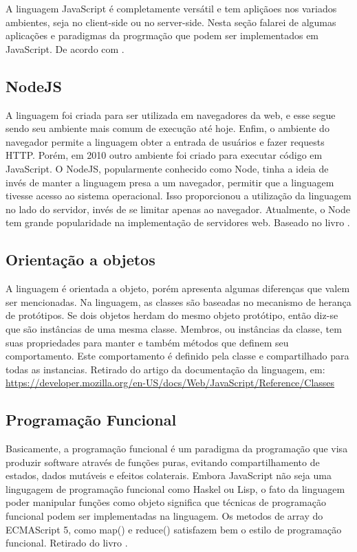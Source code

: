    A linguagem JavaScript é completamente versátil e tem apliçãoes nos variados ambientes, seja no client-side ou no server-side. 
   Nesta seção
   falarei de algumas aplicações e paradigmas da progrmação que podem ser implementados em JavaScript.
   De acordo com \cite{flanagan2020javascript}.
        \subsection{NodeJS}
        A linguagem foi criada para ser utilizada em navegadores da web, e esse segue sendo seu ambiente mais comum de execução até hoje. Enfim, o ambiente do navegador permite a linguagem obter a entrada de usuários e fazer requests HTTP. Porém, em 2010 outro ambiente foi criado para executar código em JavaScript. 
O NodeJS, popularmente conhecido como Node, tinha a ideia de invés de manter a linguagem presa a um navegador, 
permitir que a linguagem tivesse acesso ao sistema operacional. Isso proporcionou a utilização da linguagem no lado do servidor, invés de se limitar apenas ao navegador. Atualmente, o Node tem grande popularidade na implementação de servidores web.
Baseado no livro \cite{flanagan2020javascript}.
        \subsection{ Orienta\c{c}\~{a}o a objetos}
        A linguagem é orientada a objeto, porém apresenta algumas diferenças que valem ser mencionadas. 
        Na linguagem, as classes são baseadas no mecanismo de herança de protótipos. Se dois objetos herdam do mesmo objeto protótipo, então diz-se que são instâncias de uma mesma classe. 
        Membros, ou instâncias da classe, tem suas propriedades para manter e também métodos que definem seu comportamento. Este comportamento é definido pela classe e compartilhado para todas as instancias.
Retirado do artigo da documentação da linguagem, em: \url{https://developer.mozilla.org/en-US/docs/Web/JavaScript/Reference/Classes}
         \subsection{Programação Funcional}
         Basicamente, a programação funcional é um paradigma da programação que visa produzir software através de funções puras, 
         evitando compartilhamento de estados, dados mutáveis e efeitos colaterais.
         Embora JavaScript não seja uma lingugagem de programação funcional como Haskel ou Lisp, 
         o fato da linguagem poder manipular funções como objeto significa que técnicas de programação funcional podem ser implementadas na linguagem.
         Os metodos de array do ECMAScript 5, como map() e reduce() satisfazem bem o estilo de programação funcional. 
         Retirado do livro \cite{powers2015javascript}.
       